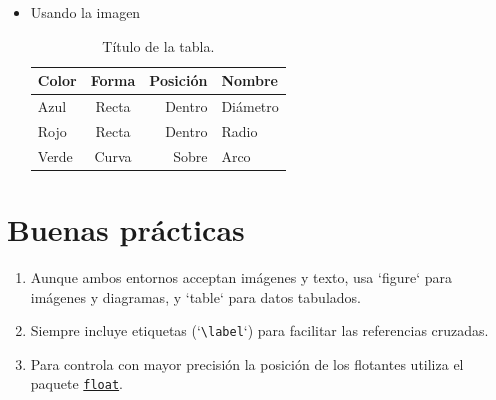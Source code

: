 \documentclass{book}
\begin{document}
\begin{itemize}
    \item Usando la imagen 
    \begin{codigo}
    \begin{LTXexample}[numbers=none]
        \begin{table}[h]
            \centering
            \begin{tabular}{lcrp{3cm}}
            \toprule
            Color & Forma & Posición & Nombre \\ \midrule
            Azul & Recta & Dentro & Diámetro\\ 
            Rojo & Recta & Dentro & Radio\\
            Verde & Curva & Sobre & Arco\\
            \bottomrule
            \end{tabular} 
        \caption{Título de la tabla.}
        \label{tabla:unatabla}
        \end{table}
    \end{LTXexample}
    \label{ejemplo:table}
    \end{codigo}

\end{itemize}

\section{Buenas prácticas}
\begin{enumerate}
    \item Aunque  ambos entornos acceptan imágenes y texto, usa `figure` para imágenes y diagramas, y `table` para datos tabulados.
    \item Siempre incluye etiquetas (`\verb|\label|`) para facilitar las referencias cruzadas.
    \item Para controla con mayor precisión la posición de los flotantes utiliza el paquete \hyperref[ch:float]{\texttt{float}}.
\end{enumerate}
\end{document}
